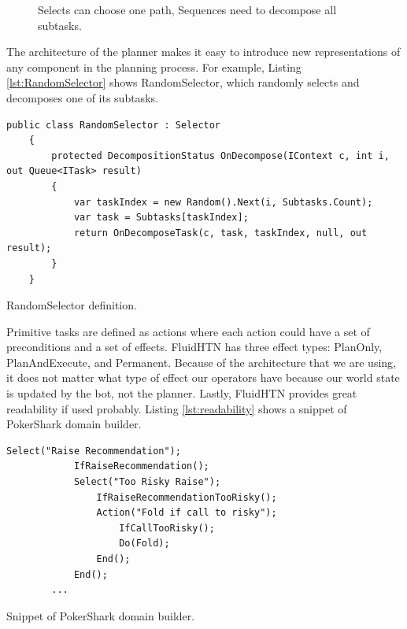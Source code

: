 \begin{figure}[h]
    \centering
    \caption{Selects can choose one path, Sequences need to decompose all subtasks.}
    \label{fig:select_sequence}
\end{figure}

The architecture of the planner makes it easy to introduce new representations of any component in the planning process. For example, Listing \ref{lst:RandomSelector} shows RandomSelector, which randomly selects and decomposes one of its subtasks.

\begin{Listing}
    \begin{lstlisting}[language={[Sharp]C}]
    public class RandomSelector : Selector
    {
        protected DecompositionStatus OnDecompose(IContext c, int i, out Queue<ITask> result)
        {
            var taskIndex = new Random().Next(i, Subtasks.Count);
            var task = Subtasks[taskIndex];
            return OnDecomposeTask(c, task, taskIndex, null, out result);
        }
    }
    \end{lstlisting}
    \caption{RandomSelector definition.}
    \label{lst:RandomSelector}
\end{Listing}

Primitive tasks are defined as actions where each action could have a set of preconditions and a set of effects. FluidHTN has three effect types: PlanOnly, PlanAndExecute, and Permanent. Because of the architecture that we are using, it does not matter what type of effect our operators have because our world state is updated by the bot, not the planner. Lastly, FluidHTN provides great readability if used probably. Listing \ref{lst:readability} shows a snippet of PokerShark domain builder.
\begin{Listing}
    \begin{lstlisting}[language={[Sharp]C}]
        Select("Raise Recommendation");    
            IfRaiseRecommendation();
            Select("Too Risky Raise");
                IfRaiseRecommendationTooRisky();
                Action("Fold if call to risky");
                    IfCallTooRisky();
                    Do(Fold);
                End();
            End();
        ...
    \end{lstlisting}
    \caption{Snippet of PokerShark domain builder.}
    \label{lst:readability}
\end{Listing}